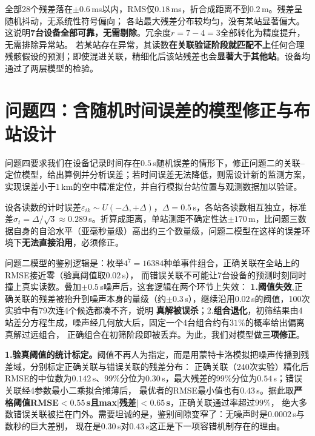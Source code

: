 \documentclass[draft,12pt,a4paper]{ctexart}
\theoremstyle{definition}
\begin{document}
全部28个残差落在$\pm0.6$\,ms以内，RMS仅$0.18$\,ms，折合成距离不到$0.2$\,m。残差呈随机抖动，无系统性符号偏向；
各站最大残差分布较均匀，没有某站显著偏大。这说明\textbf{7台设备全部可靠，无需剔除}。冗余度$r=7-4=3$全部转化为精度提升，无需排除异常站。
若某站存在异常，其读数\textbf{在关联验证阶段就匹配不上}任何合理残骸假设的预测；即使混进关联，精细化后该站残差也会\textbf{显著大于其他站}。设备均通过了两层模型的检验。



\section{问题四：含随机时间误差的模型修正与布站设计}

问题四要求我们在设备记录时间存在$0.5$\,s随机误差的情形下，修正问题二的关联--定位模型，给出算例并分析误差；若时间误差无法降低，则需设计新的监测方案，实现误差小于$1$\,km的空中精准定位，并自行模拟台站位置与观测数据加以验证。

设各读数的计时误差$\varepsilon_{ik}\sim U(-\Delta,+\Delta)$，$\Delta=0.5$\,s，各站各读数相互独立，标准差$\sigma_t=\Delta/\sqrt{3}\approx0.289$\,s。折算成距离，单站测距不确定性达$\pm170$\,m，比问题三数据自身的自洽水平（亚毫秒量级）高出约三个数量级，问题二模型在这样的误差环境下\textbf{无法直接沿用}，必须修正。

问题二模型的鉴别逻辑是：枚举$4^7=16384$种单事件组合，正确关联在全站上的RMSE接近零（验真阈值取$0.02$\,s），
而错误关联不可能让7台设备的预测时刻同时撞上真实读数。叠加$\pm0.5$\,s噪声后，这套逻辑在两个环节上失效：
\textbf{1.阈值失效},正确关联的残差被抬升到噪声本身的量级（约$\pm0.3$\,s），继续沿用$0.02$\,s的阈值，100次实验中有79次连4个候选都凑不齐，说明
\textbf{真解被误杀}；2.\textbf{组合退化}，初筛结果由4站差分方程生成，噪声经几何放大后，固定一个4台组合约有$31\%$的概率给出偏离真解过远组合，
正确组合在初筛阶段即被丢弃。为此，我们对模型做\textbf{三项修正}。

\textbf{1.验真阈值的统计标定。}阈值不再人为指定，而是用蒙特卡洛模拟把噪声传播到残差域，分别标定正确关联与错误关联的残差分布：
正确关联（240次实验）精化后RMSE的中位数为$0.142$\,s、99\%分位为$0.30$\,s，最大残差的99\%分位为$0.54$\,s；错误关联经4参数最小二乘拟合摊薄后，
最优者的RMSE最小值也有$0.43$\,s。据此取\textbf{严格阈值RMSE$<0.55$\,s且max$|$残差$|<0.65$\,s}，正确关联通过率超过$99\%$，
绝大多数错误关联被拦在门外。需要坦诚的是，鉴别间隙变窄了：无噪声时是$0.0002$\,s与数秒的巨大差别，
现在是$0.30$\,s对$0.43$\,s这正是下一项容错机制存在的理由。
\end{document}
